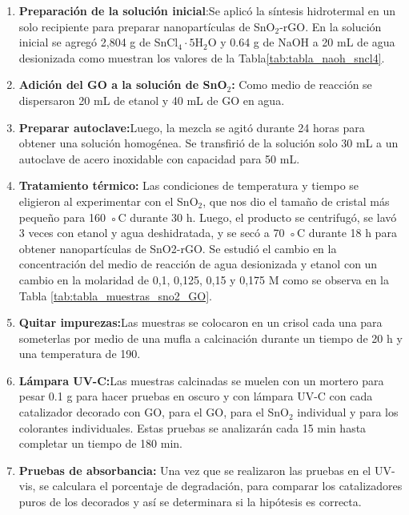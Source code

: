 \documentclass[12pt]{article}
\begin{document}
         \begin{enumerate}
            \item \textbf{Preparación de la solución inicial}:Se aplicó la síntesis hidrotermal en un solo recipiente para preparar nanopartículas de SnO$\displaystyle_{2}$-rGO. En la solución inicial se agregó 2,804 g de SnCl$_{4} \cdot 5$H$_{2}$O y 0.64 g de NaOH a 20 mL de agua desionizada como muestran los valores de la Tabla\ref{tab:tabla_naoh_sncl4}.
            
            \item \textbf{Adición del GO a la solución de SnO$\displaystyle _{2}$:} Como medio de reacción se dispersaron 20 mL de etanol y 40 mL de GO en agua.
            
            \item \textbf{Preparar autoclave:}Luego, la mezcla se agitó durante 24 horas para obtener una solución homogénea. Se transfirió de la solución solo 30 mL a un autoclave de acero inoxidable con capacidad para 50 mL.
            
            \item \textbf{Tratamiento térmico:} Las condiciones 
            de temperatura y tiempo se eligieron al experimentar con el SnO$_{2}$, que nos dio el tamaño de cristal más pequeño para 160 ◦C durante 30 h. Luego, el producto se centrifugó, se lavó 3 veces con etanol y agua deshidratada, y se secó a 70 ◦C durante 18 h para obtener nanopartículas de SnO2-rGO. Se estudió el cambio en la concentración del medio de reacción de agua desionizada y etanol con un cambio en la molaridad de 0,1, 0,125, 0,15 y 0,175 M como se observa en la Tabla \ref{tab:tabla_muestras_sno2_GO}.
            
            \item \textbf{Quitar impurezas:}Las muestras se colocaron en un crisol cada una para someterlas por medio de una mufla a calcinación durante un tiempo de 20 h y una temperatura de 190. 
            
            \item \textbf{Lámpara UV-C:}Las muestras calcinadas se muelen con un mortero para pesar 0.1 g para hacer pruebas en oscuro y con lámpara UV-C con cada catalizador decorado con GO, para el GO, para el SnO$\displaystyle _{2}$ individual y para los colorantes individuales. Estas pruebas se analizarán cada 15 min hasta completar un tiempo de 180 min. 
            \item \textbf{Pruebas de absorbancia:} Una vez que se realizaron las pruebas en el UV-vis, se calculara el porcentaje de degradación, para comparar los catalizadores puros de los decorados y así se determinara si la hipótesis es correcta.
            
         \end{enumerate}
\end{document}
